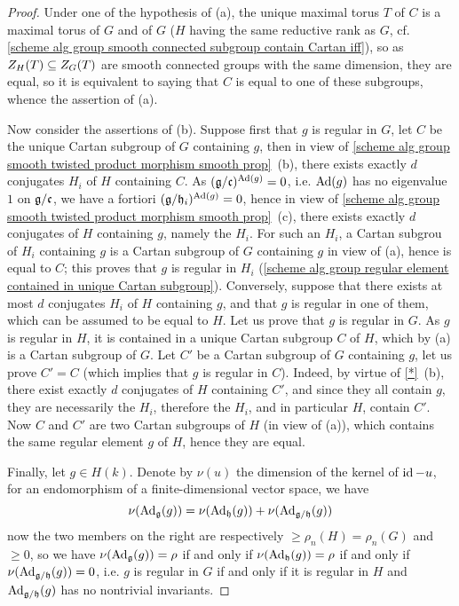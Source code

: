\begin{proof}
Under one of the hypothesis of (a), the unique maximal torus $T$ of $C$ is a maximal torus of $G$ and of $G$ ($H$ having the same reductive rank as $G$, cf. \cref{scheme alg group smooth connected subgroup contain Cartan iff}), so as $Z_H(T)\subseteq Z_G(T)$ are smooth connected groups with the same dimension, they are equal, so it is equivalent to saying that $C$ is equal to one of these subgroups, whence the assertion of (a).\par
Now consider the assertions of (b). Suppose first that $g$ is regular in $G$, let $C$ be the unique Cartan subgroup of $G$ containing $g$, then in view of \cref{scheme alg group smooth twisted product morphism smooth prop}~(b), there exists exactly $d$ conjugates $H_i$ of $H$ containing $C$. As $(\mathfrak{g}/\mathfrak{c})^{\mathrm{Ad}(g)}=0$, i.e. $\mathrm{Ad}(g)$ has no eigenvalue $1$ on $\mathfrak{g}/\mathfrak{c}$, we have a fortiori $(\mathfrak{g}/\mathfrak{h}_i)^{\mathrm{Ad}(g)}=0$, hence in view of \cref{scheme alg group smooth twisted product morphism smooth prop}~(c), there exists exactly $d$ conjugates of $H$ containing $g$, namely the $H_i$. For such an $H_i$, a Cartan subgrou of $H_i$ containing $g$ is a Cartan subgroup of $G$ containing $g$ in view of (a), hence is equal to $C$; this proves that $g$ is regular in $H_i$ (\cref{scheme alg group regular element contained in unique Cartan subgroup}). Conversely, suppose that there exists at most $d$ conjugates $H_i$ of $H$ containing $g$, and that $g$ is regular in one of them, which can be assumed to be equal to $H$. Let us prove that $g$ is regular in $G$. As $g$ is regular in $H$, it is contained in a unique Cartan subgroup $C$ of $H$, which by (a) is a Cartan subgroup of $G$. Let $C'$ be a Cartan subgroup of $G$ containing $g$, let us prove $C'=C$ (which implies that $g$ is regular in $C$). Indeed, by virtue of \cref{*}~(b), there exist exactly $d$ conjugates of $H$ containing $C'$, and since they all contain $g$, they are necessarily the $H_i$, therefore the $H_i$, and in particular $H$, contain $C'$. Now $C$ and $C'$ are two Cartan subgroups of $H$ (in view of (a)), which contains the same regular element $g$ of $H$, hence they are equal.\par
Finally, let $g\in H(k)$. Denote by $\nu(u)$ the dimension of the kernel of $\operatorname{id}-u$, for an endomorphism of a finite-dimensional vector space, we have
\[\nu(\mathrm{Ad}_{\mathfrak{g}}(g))=\nu(\mathrm{Ad}_{\mathfrak{h}}(g))+\nu(\mathrm{Ad}_{\mathfrak{g}/\mathfrak{h}}(g))\]
now the two members on the right are respectively $\geq\rho_n(H)=\rho_n(G)$ and $\geq 0$, so we have $\nu(\mathrm{Ad}_{\mathfrak{g}}(g))=\rho$ if and only if $\nu(\mathrm{Ad}_{\mathfrak{h}}(g))=\rho$ if and only if $\nu(\mathrm{Ad}_{\mathfrak{g}/\mathfrak{h}}(g))=0$, i.e. $g$ is regular in $G$ if and only if it is regular in $H$ and $\mathrm{Ad}_{\mathfrak{g}/\mathfrak{h}}(g)$ has no nontrivial invariants.
\end{proof}

